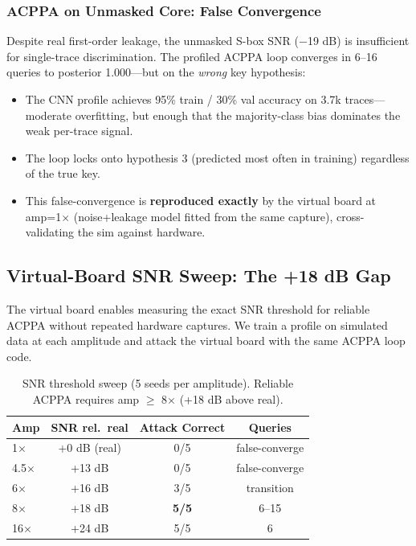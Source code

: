 \documentclass[a4paper,11pt,twocolumn]{article}
\begin{document}
\subsubsection{ACPPA on Unmasked Core: False Convergence}

Despite real first-order leakage, the unmasked S-box SNR ($-$19 dB) is insufficient for single-trace discrimination. The profiled ACPPA loop converges in 6--16 queries to posterior 1.000---but on the \emph{wrong} key hypothesis:

\begin{itemize}[leftmargin=*,nosep]
\item The CNN profile achieves 95\% train / 30\% val accuracy on 3.7k traces---moderate overfitting, but enough that the majority-class bias dominates the weak per-trace signal.
\item The loop locks onto hypothesis 3 (predicted most often in training) regardless of the true key.
\item This false-convergence is \textbf{reproduced exactly} by the virtual board at amp=1$\times$ (noise+leakage model fitted from the same capture), cross-validating the sim against hardware.
\end{itemize}

\subsection{Virtual-Board SNR Sweep: The +18 dB Gap}

The virtual board enables measuring the exact SNR threshold for reliable ACPPA without repeated hardware captures. We train a profile on simulated data at each amplitude and attack the virtual board with the same ACPPA loop code.

\begin{table}[t]
\centering
\caption{SNR threshold sweep (5 seeds per amplitude). Reliable ACPPA requires amp $\geq$ 8$\times$ (+18 dB above real).}
\label{tab:snr_sweep}
\begin{tabular}{lccc}
\toprule
Amp & SNR rel.\ real & Attack Correct & Queries \\
\midrule
1$\times$ & +0 dB (real) & 0/5 & false-converge \\
4.5$\times$ & +13 dB & 0/5 & false-converge \\
6$\times$ & +16 dB & 3/5 & transition \\
8$\times$ & +18 dB & \textbf{5/5} & 6--15 \\
16$\times$ & +24 dB & 5/5 & 6 \\
\bottomrule
\end{tabular}
\end{table}
\end{document}
